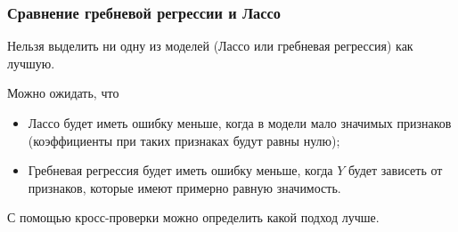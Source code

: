 \documentclass[unicode, notheorems]{beamer}
\begin{document}
\begin{frame}
\begin{frame}
\end{frame}

\begin{frame}
\frametitle{Сравнение гребневой регрессии и Лассо}

Нельзя выделить ни одну из моделей (Лассо или гребневая регрессия) как лучшую.

\vspace{0.8cm}
Можно ожидать, что 
\begin{itemize}
\item Лассо будет иметь ошибку меньше, когда в модели мало значимых признаков (коэффициенты при таких признаках будут равны нулю);
\item Гребневая регрессия будет иметь ошибку меньше, когда $Y$ будет зависеть от признаков, которые имеют примерно равную значимость. 
\end{itemize}


\vspace{0.8cm}
С помощью кросс-проверки можно определить какой подход лучше.

\end{frame}
\end{document}
